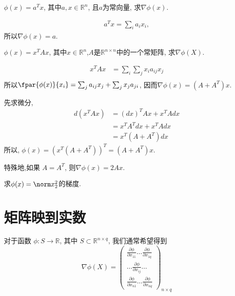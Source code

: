\documentclass{ctexbook}
\begin{document}
\begin{example}
$\phi(x) = a^Tx$, 其中$a, x\in \mathbb R^n$, 且$a$为常向量, 求$\nabla \phi(x)$.


\begin{mulsol}
	\begin{align*}
  a^Tx = \sum_i a_ix_i,
\end{align*}
所以$\nabla \phi(x) = a$.
\end{mulsol}
\end{example}
\begin{example}
$\phi(x) = x^TAx$, 其中$ x\in \mathbb R^n$,$A$是$\mathbb R^{n\times n}$中的一个常矩阵,  求$\nabla \phi(X)$.
\begin{mulsol}
	\begin{align*}
  x^TAx &= \sum_i\sum_j x_ia_{ij}x_j\\
\end{align*}
所以$\fpar{\phi(x)}{x_{i}} = \sum_j a_{ij}x_j+\sum_j x_ja_{ji}$, 因而$\nabla \phi(x) = (A+A^T)x$.
\end{mulsol}

\begin{mulsol}
	先求微分, 
	\begin{align*}
  d(x^TAx) &= (dx)^TAx + x^TAdx\\
  &=x^T A^T dx + x^TAdx\\
  &= x^T(A+A^T)dx
\end{align*}
所以, $\phi(x) = (x^T(A+A^T))^T= (A+A^T)x$.
\end{mulsol}
特殊地,如果 $A=A^T$, 则$\nabla \phi(x) = 2Ax$.	
\end{example}

\begin{example}
	求$\phi(x) = \norm x_2^2$的梯度.
\end{example}

\section{矩阵映到实数}
对于函数 $\phi : S \rightarrow \mathbb R$, 其中 $S\subset \mathbb R^{n\times q} $, 我们通常希望得到
\begin{equation*}
  \nabla \phi(X) =
  \begin{pmatrix}
  	\frac{\partial \phi}{\partial x_{11}} \dots \frac{\partial \phi}{\partial x_{1q}}\\
  	\dots \frac{\partial \phi}{\partial x_{ij}} \dots \\
  	\frac{\partial \phi}{\partial x_{n1}} \dots \frac{\partial \phi}{\partial x_{nq}}
  \end{pmatrix}_{n\times q}
\end{equation*}
\end{document}
